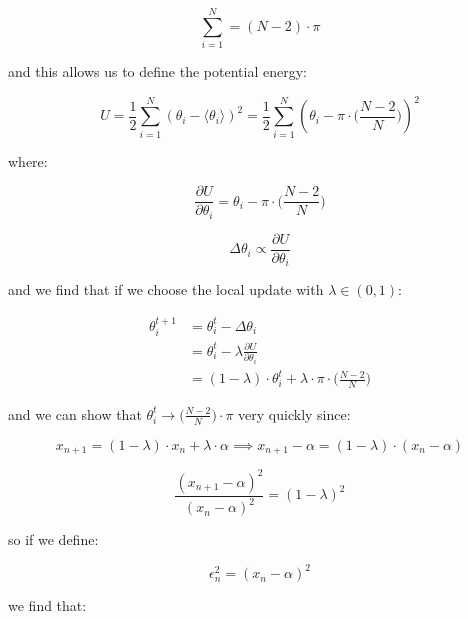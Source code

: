 \documentclass{article}
\begin{document}
\begin{equation}
\sum_{i=1}^N = (N-2) \cdot \pi
\end{equation}

and this allows us to define the potential energy:

\begin{equation}
U = \frac{1}{2} \sum_{i=1}^N (\theta_i - \langle \theta_i \rangle)^2 = \frac{1}{2} \sum_{i=1}^N (\theta_i - \pi \cdot \big(\frac{N-2}{N}\big))^2
\end{equation}

where:

\begin{equation}
\frac{\partial U}{\partial \theta_i} = \theta_i - \pi \cdot \big(\frac{N-2}{N}\big)
\end{equation}

\begin{equation}
\Delta \theta_i \propto \frac{\partial U}{\partial \theta_i}
\end{equation}

and we find that if we choose the local update with $\lambda \in (0,1)$:

\begin{equation}
\begin{split}
\theta_i^{t+1} & = \theta_i^{t} - \Delta \theta_i \\\
& = \theta_i^{t} - \lambda \frac{\partial U}{\partial \theta_i} \\\
& = (1-\lambda) \cdot \theta_i^t + \lambda \cdot \pi \cdot \big(\frac{N-2}{N}\big)
\end{split}
\end{equation}

and we can show that $\theta_i^t \rightarrow \big(\frac{N-2}{N}\big) \cdot \pi$ very quickly since:

\begin{equation}
x_{n+1} = (1-\lambda) \cdot x_n + \lambda \cdot \alpha \implies x_{n+1} - \alpha = (1-\lambda) \cdot (x_n - \alpha)
\end{equation}

\begin{equation}
\frac{(x_{n+1}-\alpha)^2}{(x_n - \alpha)^2} = (1-\lambda)^2
\end{equation}

so if we define:

\begin{equation}
\epsilon_{n}^2 = (x_{n}-\alpha)^2
\end{equation}

we find that:
\end{document}
